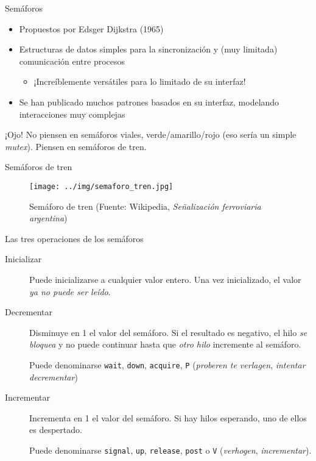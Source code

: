 \documentclass[presentation]{beamer}
\begin{document}
\begin{frame}[label={sec:orgc916913}]{Semáforos}
\begin{itemize}
\item Propuestos por Edsger Dijkstra (1965)
\item Estructuras de datos simples para la sincronización y (muy
limitada) comunicación entre procesos
\begin{itemize}
\item ¡Increíblemente versátiles para lo limitado de su interfaz!
\end{itemize}
\item Se han publicado muchos patrones basados en su interfaz, modelando
interacciones muy complejas
\end{itemize}
\begin{center}
\alert{¡Ojo!} No piensen en semáforos viales, verde/amarillo/rojo (eso sería
un simple \emph{mutex}). Piensen en semáforos de tren.
\end{center}
\end{frame}

\begin{frame}[label={sec:org0788d39}]{Semáforos de tren}
\begin{figure}[htbp]
\centering
\texttt{[image: ../img/semaforo\_tren.jpg]}
\caption{Semáforo de tren (Fuente: Wikipedia, \emph{Señalización ferroviaria argentina})}
\end{figure}
\end{frame}

\begin{frame}[label={sec:orgd2fff16},fragile]{Las tres operaciones de los semáforos}
 \begin{description}
\item[{Inicializar}] Puede inicializarse a cualquier valor entero. Una
vez inicializado, el valor \emph{ya no puede ser leído}.
\item[{Decrementar}] Disminuye en 1 el valor del semáforo. Si el
resultado es negativo, el hilo \emph{se bloquea} y no
puede continuar hasta que \emph{otro hilo} incremente
al semáforo.

Puede denominarse \texttt{wait}, \texttt{down}, \texttt{acquire}, \texttt{P}
(\emph{proberen te verlagen}, \emph{intentar decrementar})
\item[{Incrementar}] Incrementa en 1 el valor del semáforo. Si hay
hilos esperando, uno de ellos es despertado.

Puede denominarse \texttt{signal}, \texttt{up}, \texttt{release},
\texttt{post} o \texttt{V} (\emph{verhogen}, \emph{incrementar}).
\end{description}
\end{frame}
\end{document}
